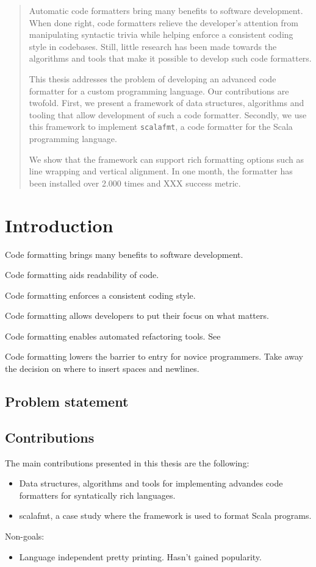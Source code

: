 \documentclass[11pt,a4paper]{article}
\begin{document}



\begin{abstract}
  Automatic code formatters bring many benefits to software development.
  When done right, code formatters relieve the developer's attention from manipulating
  syntactic trivia while helping enforce a consistent coding style in codebases.
  Still, little research has been made towards the algorithms and tools that make it possible to develop such code formatters.

  This thesis addresses the problem of developing an advanced code formatter for a custom programming language.
  Our contributions are twofold.
  First, we present a framework of data structures, algorithms and tooling that allow development of such a code formatter.
  Secondly, we use this framework to implement \texttt{scalafmt}, a code formatter for the Scala programming language.

  We show that the framework can support rich formatting options such as
  line wrapping and vertical alignment.
  In one month, the formatter has been installed over 2.000 times and XXX success metric.
\end{abstract}
\tableofcontents

\section{Introduction} %
\label{sec:Introduction}
Code formatting brings many benefits to software development.

Code formatting aids readability of code.

Code formatting enforces a consistent coding style.

Code formatting allows developers to put their focus on what matters.

Code formatting enables automated refactoring tools.
See~\autocite{wright_large-scale_2013}

Code formatting lowers the barrier to entry for novice programmers.
Take away the decision on where to insert spaces and newlines.

\subsection{Problem statement}
\subsection{Contributions}
The main contributions presented in this thesis are the following:
\begin{itemize}
    \item Data structures, algorithms and tools for implementing advandes code formatters for syntatically rich languages.
    \item scalafmt, a case study where the framework is used to format Scala programs.
\end{itemize}
Non-goals:
\begin{itemize}
    \item Language independent pretty printing. Hasn't gained popularity.
\end{itemize}
\end{document}
